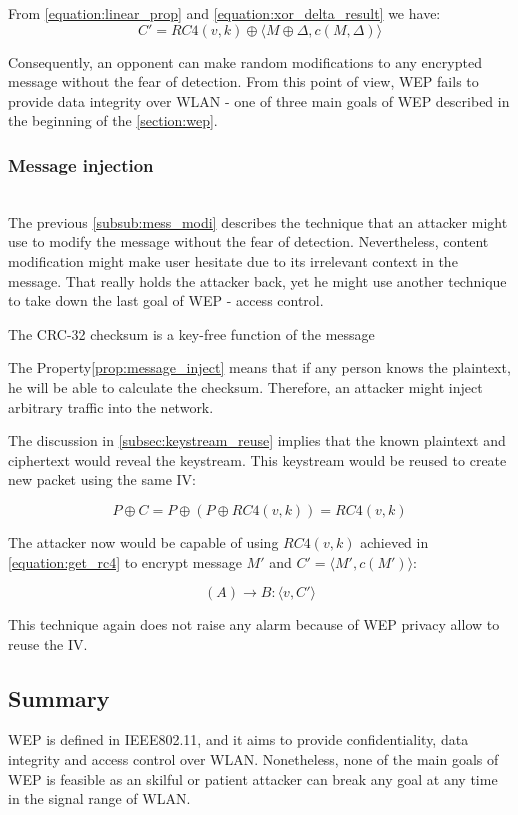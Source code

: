 From \autoref{equation:linear_prop} and \autoref{equation:xor_delta_result} we have:
\begin{equation}
	C' = RC4(v,k) \oplus \langle M\oplus\Delta, c(M, \Delta)\rangle
\end{equation}

Consequently, an opponent can make random modifications to any encrypted message without the fear of detection. From this point of view, \ac{WEP} fails to provide data integrity over \ac{WLAN} - one of three main goals of \ac{WEP} described in the beginning of the \autoref{section:wep}.

\subsubsection{Message injection}~\\
The previous \autoref{subsub:mess_modi} describes the technique that an attacker might use to modify the message without the fear of detection. Nevertheless, content modification might make user hesitate due to its irrelevant context in the message. That really holds the attacker back, yet he might use another technique to take down the last goal of \ac{WEP} - access control.

\begin{property}
	The \ac{CRC}-32 checksum is a key-free function of the message \cite{borisov2001intercepting}
	\label{prop:message_inject}
\end{property}

The Property\autoref{prop:message_inject} means that if any person knows the plaintext, he will be able to calculate the checksum. Therefore, an attacker might inject arbitrary traffic into the network.

The discussion in \autoref{subsec:keystream_reuse} implies that the known plaintext and ciphertext would reveal the keystream. This keystream would be reused to create new packet using the same \ac{IV}:

\begin{equation}
	P \oplus C = P \oplus (P \oplus RC4(v, k)) = RC4(v, k)
	\label{equation:get_rc4}
\end{equation}

The attacker now would be capable of using $RC4(v, k)$ achieved in \autoref{equation:get_rc4} to encrypt message $M'$ and $C' = \langle M', c(M')\rangle$:

\begin{equation}
 (A) \rightarrow B: \langle v, C'\rangle
\end{equation}

This technique again does not raise any alarm because of \ac{WEP} privacy allow to reuse the \ac{IV}.

\subsection{Summary}
\ac{WEP} is defined in \ac{IEEE}802.11, and it aims to provide confidentiality, data integrity and access control over \ac{WLAN}. Nonetheless, none of the main goals of \ac{WEP} is feasible as an skilful
or patient attacker can break any goal at any time in the signal range of \ac{WLAN}.